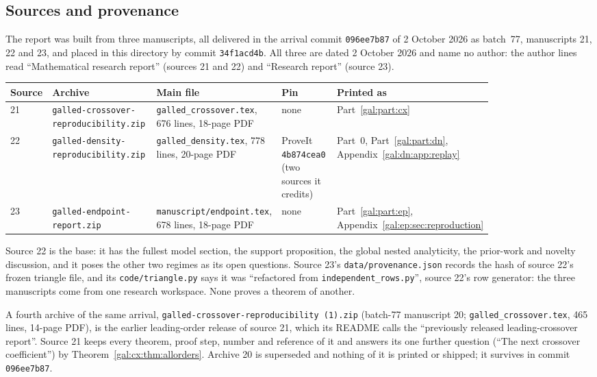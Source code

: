 \documentclass[11pt,letterpaper]{article}
\numberwithin{equation}{section}
\theoremstyle{definition}\newtheorem{definition}[theorem]{Definition}
\theoremstyle{remark}\newtheorem{remark}[theorem]{Remark}
\newcommand{\repopath}[1]{\nolinkurl{#1}}
\begin{document}
\subsection*{Sources and provenance}
\label{gal:guide:provenance}
The report was built from three manuscripts, all delivered in the arrival commit \texttt{096ee7b87} of 2 October 2026 as batch~77, manuscripts 21, 22 and 23, and placed in this directory by commit \texttt{34f1acd4b}. All three are dated 2 October 2026 and name no author: the author lines read ``Mathematical research report'' (sources 21 and 22) and ``Research report'' (source 23).
\begin{center}
\small
\begin{tabular}{@{}l>{\raggedright\arraybackslash}p{0.27\linewidth}>{\raggedright\arraybackslash}p{0.22\linewidth}>{\raggedright\arraybackslash}p{0.17\linewidth}>{\raggedright\arraybackslash}p{0.16\linewidth}@{}}
\toprule
Source & Archive & Main file & Pin & Printed as\\
\midrule
21 & \repopath{galled-crossover-reproducibility.zip} & \repopath{galled_crossover.tex}, 676 lines, 18-page PDF & none & Part~\ref{gal:part:cx}\\
22 & \repopath{galled-density-reproducibility.zip} & \repopath{galled_density.tex}, 778 lines, 20-page PDF & ProveIt \texttt{4b874cea0} (two sources it credits) & Part~0, Part~\ref{gal:part:dn}, Appendix~\ref{gal:dn:app:replay}\\
23 & \repopath{galled-endpoint-report.zip} & \repopath{manuscript/endpoint.tex}, 678 lines, 18-page PDF & none & Part~\ref{gal:part:ep}, Appendix~\ref{gal:ep:sec:reproduction}\\
\bottomrule
\end{tabular}
\end{center}
Source 22 is the base: it has the fullest model section, the support proposition, the global nested analyticity, the prior-work and novelty discussion, and it poses the other two regimes as its open questions. Source 23's \texttt{data/provenance.json} records the hash of source 22's frozen triangle file, and its \texttt{code/triangle.py} says it was ``refactored from \texttt{independent\_rows.py}'', source 22's row generator: the three manuscripts come from one research workspace. None proves a theorem of another.

A fourth archive of the same arrival, \texttt{galled-crossover-reproducibility (1).zip} (batch-77 manuscript 20; \texttt{galled\_crossover.tex}, 465 lines, 14-page PDF), is the earlier leading-order release of source 21, which its README calls the ``previously released leading-crossover report''. Source 21 keeps every theorem, proof step, number and reference of it and answers its one further question (``The next crossover coefficient'') by Theorem~\ref{gal:cx:thm:allorders}. Archive 20 is superseded and nothing of it is printed or shipped; it survives in commit \texttt{096ee7b87}.
\end{document}
